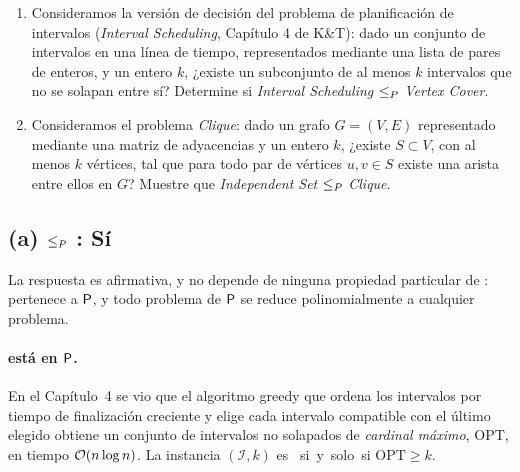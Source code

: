 \begin{enunciado}
\begin{enumerate}[label=(\alph*)]
  \item Consideramos la versión de decisión del problema de planificación de intervalos (\emph{Interval
  Scheduling}, Capítulo 4 de K\&T): dado un conjunto de intervalos en una línea de tiempo, representados
  mediante una lista de pares de enteros, y un entero $k$, ¿existe un subconjunto de al menos $k$
  intervalos que no se solapan entre sí? Determine si \emph{Interval Scheduling} $\le_P$ \emph{Vertex Cover}.
  \item Consideramos el problema \emph{Clique}: dado un grafo $G=(V,E)$ representado mediante una matriz
  de adyacencias y un entero $k$, ¿existe $S\subset V$, con al menos $k$ vértices, tal que para todo par de
  vértices $u,v\in S$ existe una arista entre ellos en $G$? Muestre que \emph{Independent Set} $\le_P$ \emph{Clique}.
\end{enumerate}
\end{enunciado}


\subsection*{(a) \IntS{} $\le_P$ \VC: \textbf{Sí}}

La respuesta es afirmativa, y no depende de ninguna propiedad particular de \VC: \IntS{} pertenece a
$\mathsf{P}$, y todo problema de $\mathsf{P}$ se reduce polinomialmente a cualquier problema.

\paragraph{\IntS{} está en $\mathsf{P}$.} En el Capítulo~4 se vio que el algoritmo greedy que ordena los
intervalos por tiempo de finalización creciente y elige cada intervalo compatible con el último elegido
obtiene un conjunto de intervalos no solapados de \emph{cardinal máximo}, $\mathrm{OPT}$, en tiempo
$\mathcal{O}(n\log n)$. La instancia $(\mathcal I, k)$ es \SI{} si y solo si $\mathrm{OPT}\ge k$.

